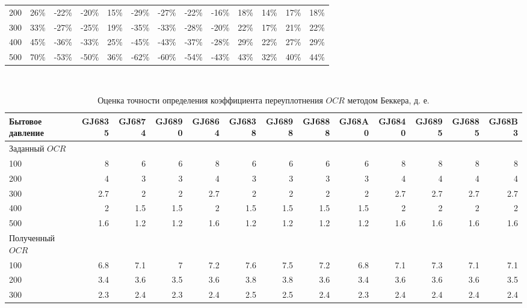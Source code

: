 \begin{sidewaystable}[p]
\begin{tabular}{@{}lrrrrrrrrrrrr@{}}
    200 & 26\% & -22\% & -20\% & 15\% & -29\% & -27\% & -22\% & -16\% & 18\% & 14\% & 17\% & 18\% \\
    300 & 33\% & -27\% & -25\% & 19\% & -35\% & -33\% & -28\% & -20\% & 22\% & 17\% & 21\% & 22\% \\
    400 & 45\% & -36\% & -33\% & 25\% & -45\% & -43\% & -37\% & -28\% & 29\% & 22\% & 27\% & 29\% \\
    500 & 70\% & -53\% & -50\% & 36\% & -62\% & -60\% & -54\% & -43\% & 43\% & 32\% & 40\% & 44\% \\
    \bottomrule
    \end{tabular}
    \\ 
\end{sidewaystable}


\begin{sidewaystable}[p]
    \centering
    \small
    \caption{Оценка точности определения коэффициента переуплотнения $OCR$ методом Беккера, д. е.} \label{tab:ocr-beck}
    \begin{tabular}{@{}lrrrrrrrrrrrr@{}}
    \toprule
    Бытовое давление & GJ6835 & GJ6874 & GJ6890 & GJ6864 & GJ6838 & GJ6898 & GJ6888 & GJ68A0 & GJ6840 & GJ6895 & GJ6885 & GJ68B3 \\
    \midrule
    Заданный $OCR$ &  &  &  &  &  &  &  &  &  &  &  &  \\
    100 & 8 & 6 & 6 & 8 & 6 & 6 & 6 & 6 & 8 & 8 & 8 & 8 \\
    200 & 4 & 3 & 3 & 4 & 3 & 3 & 3 & 3 & 4 & 4 & 4 & 4 \\
    300 & 2.7 & 2 & 2 & 2.7 & 2 & 2 & 2 & 2 & 2.7 & 2.7 & 2.7 & 2.7 \\
    400 & 2 & 1.5 & 1.5 & 2 & 1.5 & 1.5 & 1.5 & 1.5 & 2 & 2 & 2 & 2 \\
    500 & 1.6 & 1.2 & 1.2 & 1.6 & 1.2 & 1.2 & 1.2 & 1.2 & 1.6 & 1.6 & 1.6 & 1.6 \\
    \midrule
    Полученный $OCR$ &  &  &  &  &  &  &  &  &  &  &  &  \\
    100 & 6.8 & 7.1 & 7 & 7.2 & 7.6 & 7.5 & 7.2 & 6.8 & 7.1 & 7.3 & 7.1 & 7.1 \\
    200 & 3.4 & 3.6 & 3.5 & 3.6 & 3.8 & 3.8 & 3.6 & 3.4 & 3.6 & 3.6 & 3.6 & 3.5 \\
    300 & 2.3 & 2.4 & 2.3 & 2.4 & 2.5 & 2.5 & 2.4 & 2.3 & 2.4 & 2.4 & 2.4 & 2.4 \\

\end{tabular}
\end{sidewaystable}
